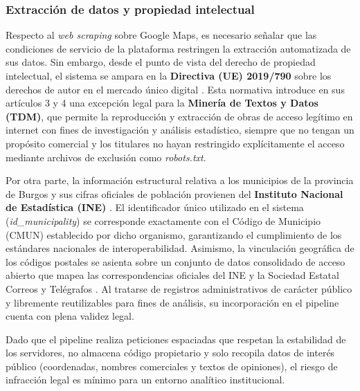 \subsubsection{Extracción de datos y propiedad intelectual}
Respecto al \textit{web scraping} sobre Google Maps, es necesario señalar que las condiciones de servicio de la plataforma restringen la extracción automatizada de sus datos. Sin embargo, desde el punto de vista del derecho de propiedad intelectual, el sistema se ampara en la \textbf{Directiva (UE) 2019/790} sobre los derechos de autor en el mercado único digital \cite{directiva_copyright_2019}. Esta normativa introduce en sus artículos 3 y 4 una excepción legal para la \textbf{Minería de Textos y Datos (TDM)}, que permite la reproducción y extracción de obras de acceso legítimo en internet con fines de investigación y análisis estadístico, siempre que no tengan un propósito comercial y los titulares no hayan restringido explícitamente el acceso mediante archivos de exclusión como \textit{robots.txt}. 

Por otra parte, la información estructural relativa a los municipios de la provincia de Burgos y sus cifras oficiales de población provienen del \textbf{Instituto Nacional de Estadística (INE)} \cite{ine_codmun}. El identificador único utilizado en el sistema (\textit{id\_municipality}) se corresponde exactamente con el Código de Municipio (CMUN) establecido por dicho organismo, garantizando el cumplimiento de los estándares nacionales de interoperabilidad. Asimismo, la vinculación geográfica de los códigos postales se asienta sobre un conjunto de datos consolidado de acceso abierto que mapea las correspondencias oficiales del INE y la Sociedad Estatal Correos y Telégrafos \cite{github_codigos_postales}. Al tratarse de registros administrativos de carácter público y libremente reutilizables para fines de análisis, su incorporación en el pipeline cuenta con plena validez legal.

Dado que el pipeline realiza peticiones espaciadas que respetan la estabilidad de los servidores, no almacena código propietario y solo recopila datos de interés público (coordenadas, nombres comerciales y textos de opiniones), el riesgo de infracción legal es mínimo para un entorno analítico institucional.

